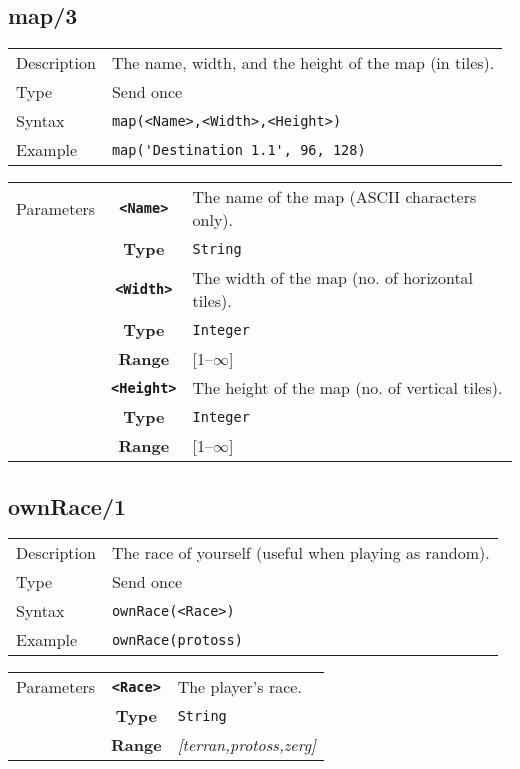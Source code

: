 \subsection{map/3}
\begin{tabularx}{\textwidth}{lX}
 Description & The name, width, and the height of the map (in tiles). \\
 Type & Send once \\
 Syntax & \verb|map(<Name>,<Width>,<Height>)| \\
 Example & \verb|map('Destination 1.1', 96, 128)| \\
 \end{tabularx}
 \begin{tabularx}{\textwidth}{l | c | p{8cm}|}
 \cline{2-3}
  Parameters & \textbf{\verb|<Name>|} & The name of the map (ASCII characters only).\\
            & \textbf{Type} & \verb|String| \\
            \cline{2-3}
            & \textbf{\verb|<Width>|} & The width of the map (no. of horizontal tiles).\\
            & \textbf{Type} & \verb|Integer| \\
            & \textbf{Range} & [1--$\infty$] \\
            \cline{2-3}
            & \textbf{\verb|<Height>|} & The height of the map (no. of vertical tiles).\\
            & \textbf{Type} & \verb|Integer| \\
            & \textbf{Range} & [1--$\infty$] \\
            \cline{2-3}
\end{tabularx}

\subsection{ownRace/1}
\begin{tabularx}{\textwidth}{lX}
 Description & The race of yourself (useful when playing as random). \\
 Type & Send once \\
 Syntax &  \verb|ownRace(<Race>)| \\
 Example & \verb|ownRace(protoss)| \\
 \end{tabularx}
 \begin{tabularx}{\textwidth}{l | c | p{8cm}|}
 \cline{2-3}
  Parameters & \textbf{\verb|<Race>|} & The player's race. \\
             & \textbf{Type} & \verb|String| \\
             & \textbf{Range} & \textit{[terran,protoss,zerg]} \\
            \cline{2-3}
\end{tabularx}


